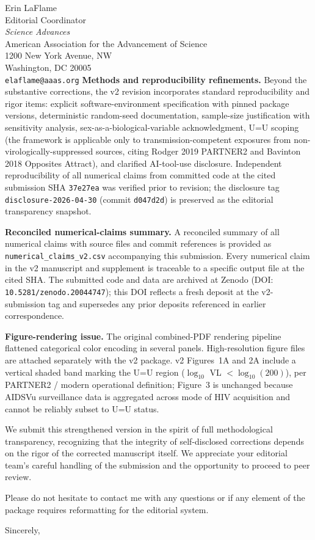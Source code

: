 \documentclass[11pt]{letter}
\begin{document}
\begin{letter}{Erin LaFlame\\
Editorial Coordinator\\
\textit{Science Advances}\\
American Association for the Advancement of Science\\
1200 New York Avenue, NW\\
Washington, DC 20005\\
\texttt{elaflame@aaas.org}}
\textbf{Methods and reproducibility refinements.} Beyond the substantive corrections, the v2 revision incorporates standard reproducibility and rigor items: explicit software-environment specification with pinned package versions, deterministic random-seed documentation, sample-size justification with sensitivity analysis, sex-as-a-biological-variable acknowledgment, U=U scoping (the framework is applicable only to transmission-competent exposures from non-virologically-suppressed sources, citing Rodger 2019 PARTNER2 and Bavinton 2018 Opposites Attract), and clarified AI-tool-use disclosure. Independent reproducibility of all numerical claims from committed code at the cited submission SHA \texttt{37e27ea} was verified prior to revision; the disclosure tag \texttt{disclosure-2026-04-30} (commit \texttt{d047d2d}) is preserved as the editorial transparency snapshot.

\textbf{Reconciled numerical-claims summary.} A reconciled summary of all numerical claims with source files and commit references is provided as \texttt{numerical\_claims\_v2.csv} accompanying this submission. Every numerical claim in the v2 manuscript and supplement is traceable to a specific output file at the cited SHA. The submitted code and data are archived at Zenodo (DOI: \texttt{10.5281/zenodo.20044747}); this DOI reflects a fresh deposit at the v2-submission tag and supersedes any prior deposits referenced in earlier correspondence.

\textbf{Figure-rendering issue.} The original combined-PDF rendering pipeline flattened categorical color encoding in several panels. High-resolution figure files are attached separately with the v2 package. v2 Figures~1A and 2A include a vertical shaded band marking the U=U region ($\log_{10}$ VL $< \log_{10}(200)$), per PARTNER2 / modern operational definition; Figure~3 is unchanged because AIDSVu surveillance data is aggregated across mode of HIV acquisition and cannot be reliably subset to U=U status.

We submit this strengthened version in the spirit of full methodological transparency, recognizing that the integrity of self-disclosed corrections depends on the rigor of the corrected manuscript itself. We appreciate your editorial team's careful handling of the submission and the opportunity to proceed to peer review.

Please do not hesitate to contact me with any questions or if any element of the package requires reformatting for the editorial system.

\closing{Sincerely,}

\end{letter}
\end{document}
